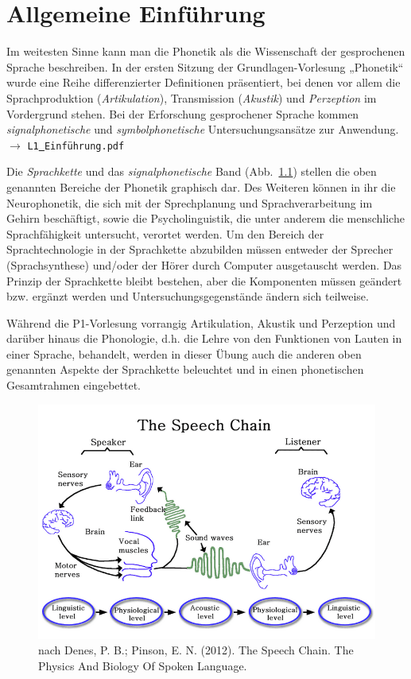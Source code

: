 \chapter{Allgemeine Einführung}

Im weitesten Sinne kann man die Phonetik als die Wissenschaft der gesprochenen Sprache beschreiben. In der ersten Sitzung der Grundlagen-Vorlesung „Phonetik“ wurde eine Reihe differenzierter Definitionen präsentiert, bei denen vor allem die Sprachproduktion (\textit{Artikulation}), Transmission (\textit{Akustik}) und \textit{Perzeption} im Vordergrund stehen. Bei der Erforschung gesprochener Sprache kommen \textit{signalphonetische} und \textit{symbolphonetische} Untersuchungsansätze zur Anwendung. $\rightarrow$ {\tt L1\underline{\ }Einführung.pdf} 

Die \textit{Sprachkette} und das \textit{signalphonetische} Band (Abb.~\ref{fig1}) stellen die oben genannten Bereiche der Phonetik graphisch dar. Des Weiteren können in ihr die Neurophonetik, die sich mit der Sprechplanung und Sprachverarbeitung im Gehirn beschäftigt, sowie die Psycholinguistik, die unter anderem die menschliche Sprachfähigkeit untersucht, verortet werden.  Um den Bereich der Sprachtechnologie in der Sprachkette abzubilden müssen entweder der Sprecher (Sprachsynthese) und/oder der Hörer durch Computer   ausgetauscht werden. Das Prinzip der Sprachkette bleibt bestehen, aber die Komponenten müssen geändert bzw. ergänzt werden und Untersuchungsgegenstände ändern sich teilweise.

Während die P1-Vorlesung vorrangig Artikulation, Akustik und Perzeption und darüber hinaus die Phonologie, d.\thinspace h. die Lehre von den Funktionen von Lauten in einer Sprache, behandelt, werden in dieser Übung auch die anderen oben genannten Aspekte der Sprachkette beleuchtet und in einen phonetischen Gesamtrahmen eingebettet.

\begin{figure}[htbp]
\begin{center}
\includegraphics[width=\textwidth]{grafiken/allgemeine-einfuehrung/speech-chain.png}
\caption{nach Denes, P. B.; Pinson, E. N. (2012). The Speech Chain. The Physics And Biology Of Spoken Language.}
\label{fig1}
\end{center}
\end{figure}

